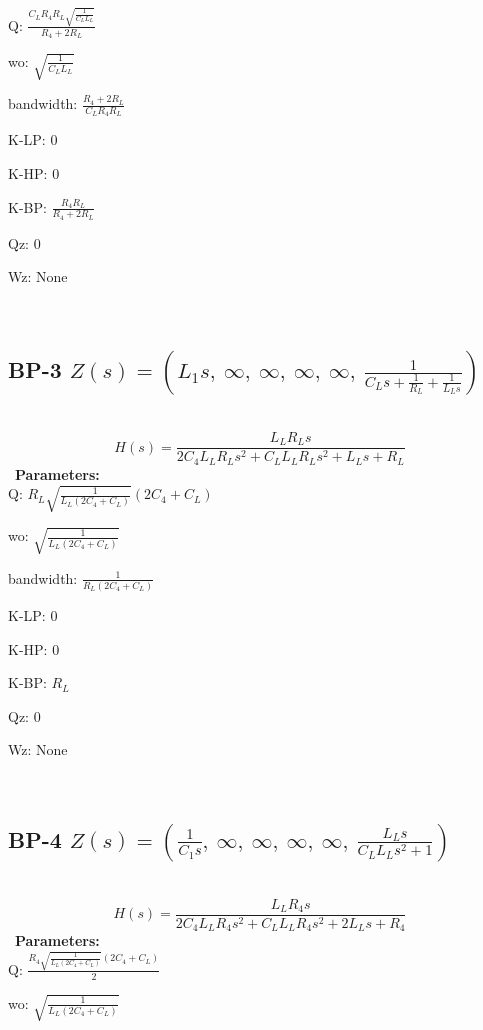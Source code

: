 \documentclass{article}
\begin{document}
Q: $\frac{C_{L} R_{4} R_{L} \sqrt{\frac{1}{C_{L} L_{L}}}}{R_{4} + 2 R_{L}}$\ 

wo: $\sqrt{\frac{1}{C_{L} L_{L}}}$\ 

bandwidth: $\frac{R_{4} + 2 R_{L}}{C_{L} R_{4} R_{L}}$\ 

K-LP: $0$\ 

K-HP: $0$\ 

K-BP: $\frac{R_{4} R_{L}}{R_{4} + 2 R_{L}}$\ 

Qz: $0$\ 

Wz: $\text{None}$\ 

\ 

\subsection{BP-3 $Z(s) = \left( L_{1} s, \  \infty, \  \infty, \  \infty, \  \infty, \  \frac{1}{C_{L} s + \frac{1}{R_{L}} + \frac{1}{L_{L} s}}\right)$ } \ 
\textbf{\[H(s) = \frac{L_{L} R_{L} s}{2 C_{4} L_{L} R_{L} s^{2} + C_{L} L_{L} R_{L} s^{2} + L_{L} s + R_{L}}\] } \ 
\textbf{Parameters:}\\ 

Q: $R_{L} \sqrt{\frac{1}{L_{L} \left(2 C_{4} + C_{L}\right)}} \left(2 C_{4} + C_{L}\right)$\ 

wo: $\sqrt{\frac{1}{L_{L} \left(2 C_{4} + C_{L}\right)}}$\ 

bandwidth: $\frac{1}{R_{L} \left(2 C_{4} + C_{L}\right)}$\ 

K-LP: $0$\ 

K-HP: $0$\ 

K-BP: $R_{L}$\ 

Qz: $0$\ 

Wz: $\text{None}$\ 

\ 

\subsection{BP-4 $Z(s) = \left( \frac{1}{C_{1} s}, \  \infty, \  \infty, \  \infty, \  \infty, \  \frac{L_{L} s}{C_{L} L_{L} s^{2} + 1}\right)$ } \ 
\textbf{\[H(s) = \frac{L_{L} R_{4} s}{2 C_{4} L_{L} R_{4} s^{2} + C_{L} L_{L} R_{4} s^{2} + 2 L_{L} s + R_{4}}\] } \ 
\textbf{Parameters:}\\ 

Q: $\frac{R_{4} \sqrt{\frac{1}{L_{L} \left(2 C_{4} + C_{L}\right)}} \left(2 C_{4} + C_{L}\right)}{2}$\ 

wo: $\sqrt{\frac{1}{L_{L} \left(2 C_{4} + C_{L}\right)}}$\ 
\end{document}

